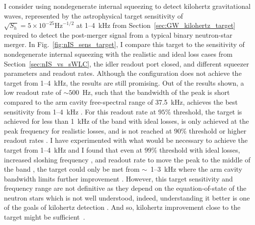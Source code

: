 I consider using nondegenerate internal squeezing to detect kilohertz gravitational waves, represented by the astrophysical target sensitivity of $\sqrt{S_h}=5\times10^{-25}\text{Hz}^{-1/2}$ at 1--4~kHz from Section~\ref{sec:GW_kilohertz_target} required to detect the post-merger signal from a typical binary neutron-star merger. In Fig.~\ref{fig:nIS_sens_target}, I compare this target to the sensitivity of nondegenerate internal squeezing with the realistic and ideal loss cases from Section~\ref{sec:nIS_vs_sWLC}, the idler readout port closed, and different squeezer parameters and readout rates. Although the configuration does not achieve the target from 1--4~kHz, the results are still promising. Out of the results shown, a low readout rate of $\sim 500$~Hz, such that the bandwidth of the peak is short compared to the arm cavity free-spectral range of 37.5~kHz, achieves the best sensitivity from 1--4~kHz . For this readout rate at $95\%$ threshold, the target is achieved for less than 1~kHz of the band  with ideal losses, is only achieved at the peak frequency  for realistic losses, and is not reached at $90\%$ threshold or higher readout rates . I have experimented with what would be necessary to achieve the target from 1--4~kHz and I found that even at $99\%$ threshold with ideal losses, increased sloshing frequency , and readout rate to move the peak to the middle of the band , the target could only be met from $\sim$~1--3~kHz where the arm cavity bandwidth limits further improvement . 
However, this target sensitivity and frequency range are not definitive as they depend on the equation-of-state of the neutron stars which is not well understood, indeed, understanding it better is one of the goals of kilohertz detection . And so, kilohertz improvement close to the target might be sufficient~\cite{}.
